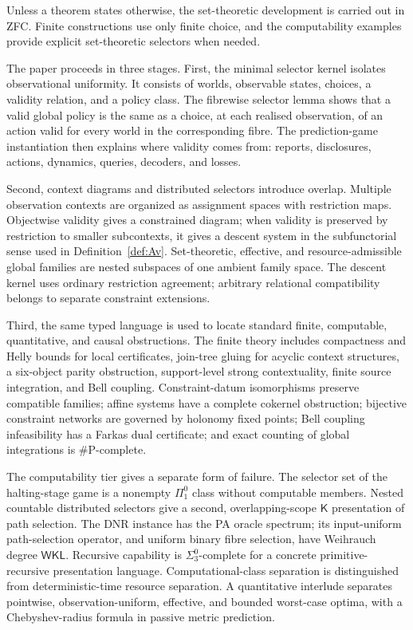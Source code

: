 \documentclass[11pt]{article}
\theoremstyle{plain}
\theoremstyle{definition}
\theoremstyle{remark}
\begin{document}
Unless a theorem states otherwise, the set-theoretic development is carried out
in ZFC. Finite constructions use only finite choice, and the computability
examples provide explicit set-theoretic selectors when needed.

The paper proceeds in three stages. First, the minimal selector kernel isolates
observational uniformity. It consists of worlds, observable states, choices, a
validity relation, and a policy class. The fibrewise selector lemma shows that a
valid global policy is the same as a choice, at each realised observation, of an
action valid for every world in the corresponding fibre. The prediction-game
instantiation then explains where validity comes from: reports, disclosures,
actions, dynamics, queries, decoders, and losses.

Second, context diagrams and distributed selectors introduce overlap. Multiple
observation contexts are organized as assignment spaces with restriction maps.
Objectwise validity gives a constrained diagram; when validity is preserved by
restriction to smaller subcontexts, it gives a descent system in the
subfunctorial sense used in Definition~\ref{def:Av}. Set-theoretic, effective,
and resource-admissible global families are nested subspaces of one ambient
family space. The descent kernel uses ordinary restriction agreement; arbitrary
relational compatibility belongs to separate constraint extensions.

Third, the same typed language is used to locate standard finite, computable,
quantitative, and causal obstructions. The finite theory includes compactness
and Helly bounds for local certificates, join-tree gluing for acyclic context
structures, a six-object parity obstruction, support-level strong contextuality,
finite source integration, and Bell coupling. Constraint-datum isomorphisms
preserve compatible families; affine systems have a complete cokernel
obstruction; bijective constraint networks are governed by holonomy fixed
points; Bell coupling infeasibility has a Farkas dual certificate; and exact
counting of global integrations is $\#\mathrm P$-complete.

The computability tier gives a separate form of failure. The selector set of the
halting-stage game is a nonempty $\Pi^0_1$ class without computable members.
Nested countable distributed selectors give a second, overlapping-scope
$\mathsf K$ presentation of path selection. The DNR instance has the PA oracle
spectrum; its input-uniform path-selection operator, and uniform binary fibre
selection, have Weihrauch degree $\mathsf{WKL}$. Recursive capability is
$\Sigma^0_3$-complete for a concrete primitive-recursive presentation language.
Computational-class separation is distinguished from deterministic-time resource
separation. A quantitative interlude separates pointwise, observation-uniform,
effective, and bounded worst-case optima, with a Chebyshev-radius formula in
passive metric prediction.
\end{document}
